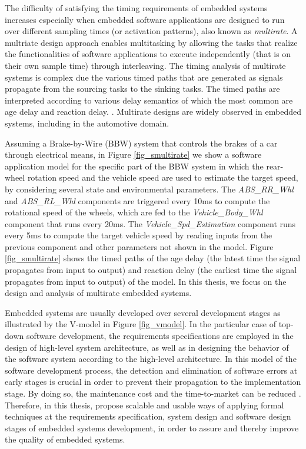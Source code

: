 The difficulty of satisfying the timing requirements of embedded systems increases especially when embedded software applications are designed to run over different sampling times (or activation patterns), also known as \textit{multirate}. A multriate design approach enables multitasking by allowing the tasks that realize the functionalities of software applications to execute independently (that is on their own sample time) through interleaving. The timing analysis of multirate systems is complex due the various timed paths that are generated as signals propagate from the sourcing tasks to the sinking tasks. The timed paths are interpreted according to various delay semantics of which the most common are age delay and reaction delay. 
\cite{Feiertag2009ASemantics,mubeen2013support,Becker2017End-to-endSystems}. Multirate designs are widely observed in embedded systems, including in the automotive domain. 

Assuming a Brake-by-Wire (BBW) system that controls the brakes of a car through electrical means, in Figure \ref{fig_smultirate} we show a software application model for the specific part of the BBW system in which the rear-wheel rotation speed and the vehicle speed are used to estimate the target speed, by considering several state and environmental parameters. The \textit{ABS\_RR\_Whl} and \textit{ABS\_RL\_Whl} components are triggered every 10ms to compute the rotational speed of the wheels, which are fed to the \textit{Vehicle\_Body\_Whl} component that runs every 20ms. The \textit{Vehicle\_Spd\_Estimation} component runs every 5ms to compute the target vehicle speed by reading inputs from the previous component and other parameters not shown in the model. Figure \ref{fig_smultirate} shows the timed paths of the age delay (the latest time the signal propagates from input to output) and reaction delay (the earliest time the signal propagates from input to output) of the model. In this thesis, we focus on the design and analysis of multirate embedded systems.


Embedded systems are usually developed over several development stages as illustrated by the V-model in Figure \ref{fig_vmodel}. In the particular case of top-down software development, the requirements specifications are employed in the design of high-level system architecture, as well as in designing the behavior of the software system according to the high-level architecture. In this model of the software development process, the detection and elimination of software errors at early stages is crucial in order to prevent their propagation to the implementation stage. By doing so, the maintenance cost and the time-to-market can be reduced \cite{Ebert2009EmbeddedFuture,Grimm2003SoftwareChallenges}. Therefore, in this thesis, propose scalable and usable ways of applying formal techniques at the requirements specification, system design and software design stages of embedded systems development, in order to assure and thereby improve the quality of embedded systems.

